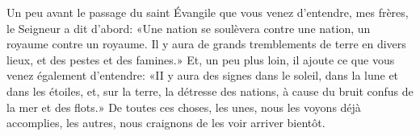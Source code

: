 Un peu avant le passage du saint Évangile que vous venez d’entendre, mes frères,
	le Seigneur a dit d’abord:
	«Une nation se soulèvera contre une nation, un royaume contre un royaume.
Il y aura de grands tremblements de terre en divers lieux,
	et des pestes et des famines.»
Et, un peu plus loin, il ajoute ce que vous venez également d’entendre:
	«II y aura des signes dans le soleil, dans la lune et dans les étoiles,
	et, sur la terre, la détresse des nations,
	à cause du bruit confus de la mer et des flots.»
De toutes ces choses, les unes, nous les voyons déjà accomplies,
	les autres, nous craignons de les voir arriver bientôt.
